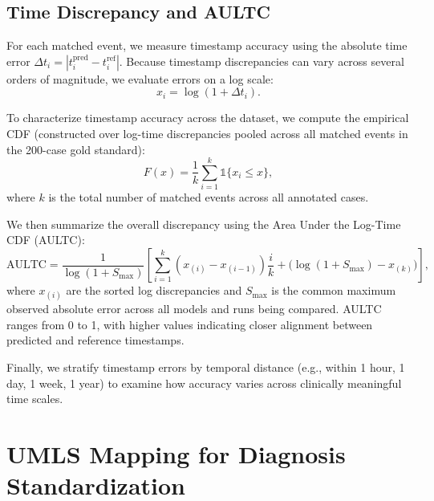 \subsection{Time Discrepancy and AULTC}
\label{apd:aultc}

For each matched event, we measure timestamp accuracy using the absolute time error
$\Delta t_i = |t^{\text{pred}}_i - t^{\text{ref}}_i|$.  
Because timestamp discrepancies can vary across several orders of magnitude, we evaluate
errors on a log scale:
\[
x_i = \log(1 + \Delta t_i).
\]

To characterize timestamp accuracy across the dataset, we compute the empirical CDF (constructed over log-time discrepancies pooled across all matched events in the 200-case gold standard):
\[
F(x) = \frac{1}{k} \sum_{i=1}^{k} \mathds{1}\{x_i \le x\},
\]
where $k$ is the total number of matched events across all annotated cases.


We then summarize the overall discrepancy using the Area Under the Log-Time CDF (AULTC):
\[
\text{AULTC} =
\frac{1}{\log(1+S_{\max})}
\left[
\sum_{i=1}^{k}(x_{(i)} - x_{(i-1)})\frac{i}{k}
+
\big( \log(1+S_{\max}) - x_{(k)} \big)
\right],
\]
where $x_{(i)}$ are the sorted log discrepancies and $S_{\max}$ is the common maximum observed absolute error across all models and runs being compared.
AULTC ranges from 0 to 1, with higher values indicating closer alignment between predicted
and reference timestamps.

Finally, we stratify timestamp errors by temporal distance (e.g., within 1 hour, 1 day, 1 week,
1 year) to examine how accuracy varies across clinically meaningful time scales.





\section{UMLS Mapping for Diagnosis Standardization}
\label{apd:umls-mapping}

